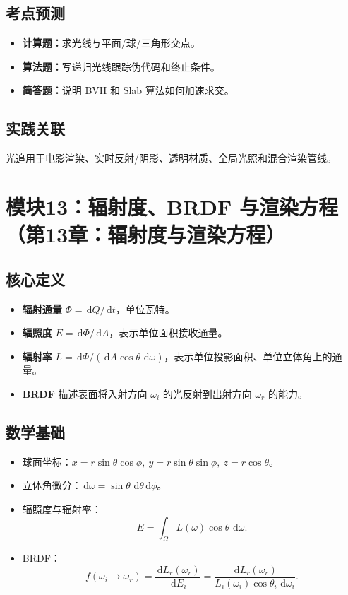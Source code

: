 \documentclass[UTF8,fontset=fandol,11pt]{ctexart}
\newcommand{\key}[1]{\textbf{#1}}
\newcommand{\exam}[1]{\textcolor{blue!55!black}{\textbf{#1}}}
\newcommand{\dd}{\,\mathrm{d}}
\begin{document}
\subsection{考点预测}
\begin{itemize}
  \item \exam{计算题：}求光线与平面/球/三角形交点。
  \item \exam{算法题：}写递归光线跟踪伪代码和终止条件。
  \item \exam{简答题：}说明 BVH 和 Slab 算法如何加速求交。
\end{itemize}
\subsection{实践关联}
光追用于电影渲染、实时反射/阴影、透明材质、全局光照和混合渲染管线。

\section{模块13：辐射度、BRDF 与渲染方程（第13章：辐射度与渲染方程）}
\subsection{核心定义}
\begin{itemize}
  \item \key{辐射通量} $\Phi=\dd Q/\dd t$，单位瓦特。
  \item \key{辐照度} $E=\dd\Phi/\dd A$，表示单位面积接收通量。
  \item \key{辐射率} $L=\dd\Phi/(\dd A\cos\theta\,\dd\omega)$，表示单位投影面积、单位立体角上的通量。
  \item \key{BRDF} 描述表面将入射方向 $\omega_i$ 的光反射到出射方向 $\omega_r$ 的能力。
\end{itemize}
\subsection{数学基础}
\begin{itemize}
  \item 球面坐标：$x=r\sin\theta\cos\phi,\ y=r\sin\theta\sin\phi,\ z=r\cos\theta$。
  \item 立体角微分：$\dd\omega=\sin\theta\,\dd\theta\dd\phi$。
  \item 辐照度与辐射率：
  \[
    E=\int_{\Omega}L(\omega)\cos\theta\,\dd\omega.
  \]
  \item BRDF：
  \[
    f(\omega_i\to\omega_r)=\frac{\dd L_r(\omega_r)}{\dd E_i}
    =\frac{\dd L_r(\omega_r)}{L_i(\omega_i)\cos\theta_i\,\dd\omega_i}.
  \]
\end{itemize}
\end{document}
